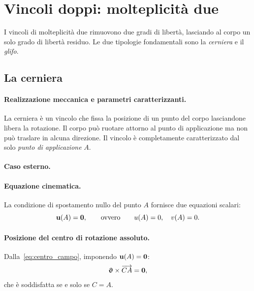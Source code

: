 \section{Vincoli doppi: molteplicità due}\label{sec:doppi}

I vincoli di molteplicità due rimuovono due gradi di libertà,
lasciando al corpo un solo grado di libertà residuo. Le due tipologie
fondamentali sono la \emph{cerniera} e il \emph{glifo}.


\subsection{La cerniera}\label{sec:cerniera}

\paragraph{Realizzazione meccanica e parametri caratterizzanti.}
La cerniera è un vincolo che fissa la posizione di un punto
del corpo lasciandone libera la rotazione. Il corpo può ruotare
attorno al punto di applicazione ma non può traslare in alcuna
direzione. Il vincolo è completamente caratterizzato dal solo
\emph{punto di applicazione} $A$.

\paragraph{Caso esterno.}

\paragraph{Equazione cinematica.}
La condizione di spostamento nullo del punto $A$ fornisce due
equazioni scalari:
\begin{equation}\label{eq:cerniera_cin}
	\mathbf{u}(A) = \mathbf{0},
	\qquad\text{ovvero}\qquad
	u(A) = 0, \quad v(A) = 0.
\end{equation}

\paragraph{Posizione del centro di rotazione assoluto.}
Dalla~\eqref{eq:centro_campo}, imponendo $\mathbf{u}(A) = \mathbf{0}$:
\begin{equation}
	\bm{\upvartheta} \times \overrightarrow{CA} = \mathbf{0},
\end{equation}
che è soddisfatta se e solo se $C = A$.

